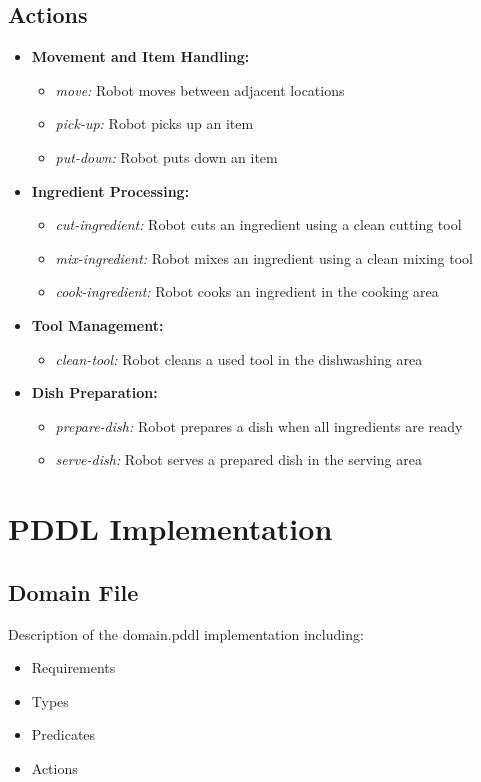 \documentclass{article}
\begin{document}
\subsection{Actions}\label{sec:act}
\begin{itemize}[label=--, itemsep=0.05em]
    \item \textbf{Movement and Item Handling:}
    \begin{itemize}
        \item \textit{move:} Robot moves between adjacent locations
        \item \textit{pick-up:} Robot picks up an item
        \item \textit{put-down:} Robot puts down an item
    \end{itemize}
    \item \textbf{Ingredient Processing:}
    \begin{itemize}
        \item \textit{cut-ingredient:} Robot cuts an ingredient using a clean cutting tool
        \item \textit{mix-ingredient:} Robot mixes an ingredient using a clean mixing tool
        \item \textit{cook-ingredient:} Robot cooks an ingredient in the cooking area
    \end{itemize}
    \item \textbf{Tool Management:}
    \begin{itemize}
        \item \textit{clean-tool:} Robot cleans a used tool in the dishwashing area
    \end{itemize}
    \item \textbf{Dish Preparation:}
    \begin{itemize}
        \item \textit{prepare-dish:} Robot prepares a dish when all ingredients are ready
        \item \textit{serve-dish:} Robot serves a prepared dish in the serving area
    \end{itemize}
\end{itemize}

\section{PDDL Implementation}
\subsection{Domain File}
Description of the domain.pddl implementation including:
\begin{itemize}
    \item Requirements
    \item Types
    \item Predicates
    \item Actions
\end{itemize}
\end{document}
